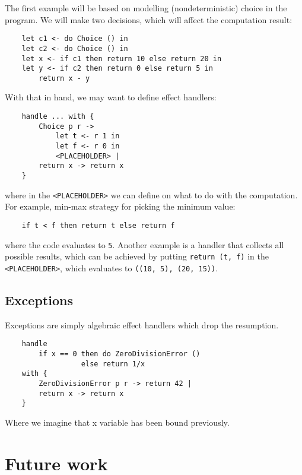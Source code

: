 \documentclass{article}
\theoremstyle{definition}
\theoremstyle{lemma}
\theoremstyle{observation}
\theoremstyle{theorem}
\begin{document}
    The first example will be based on modelling (nondeterministic) choice
    in the program. We will make two decisions, which will affect the computation
    result:

    \begin{verbatim}
    let c1 <- do Choice () in
    let c2 <- do Choice () in
    let x <- if c1 then return 10 else return 20 in
    let y <- if c2 then return 0 else return 5 in
        return x - y
    \end{verbatim}

    With that in hand, we may want to define effect handlers:

    \begin{verbatim}
    handle ... with {
        Choice p r ->
            let t <- r 1 in
            let f <- r 0 in
            <PLACEHOLDER> |
        return x -> return x
    }
    \end{verbatim}

    where in the \verb!<PLACEHOLDER>! we can define on what to do with the
    computation. For example, min-max strategy for picking the minimum value:

    \begin{verbatim}
    if t < f then return t else return f
    \end{verbatim}

    where the code evaluates to \verb!5!. Another example is a handler that
    collects all possible results, which can be achieved by putting
    \verb!return (t, f)! in the \verb!<PLACEHOLDER>!, which evaluates to \verb!((10, 5), (20, 15))!.

    \subsection{Exceptions}

    Exceptions are simply algebraic effect handlers which drop the resumption.

    \begin{verbatim}
    handle
        if x == 0 then do ZeroDivisionError ()
                  else return 1/x
    with {
        ZeroDivisionError p r -> return 42 |
        return x -> return x
    }
    \end{verbatim}
    Where we imagine that x variable has been bound previously.

\section{Future work}
\end{document}
